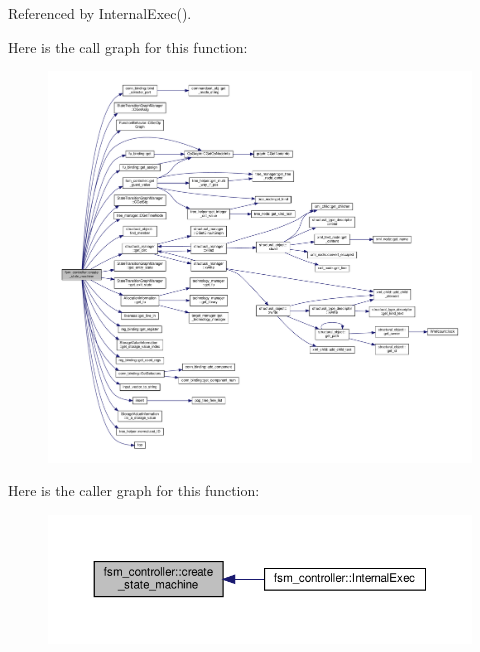 Referenced by Internal\+Exec().

Here is the call graph for this function\+:
\nopagebreak
\begin{figure}[H]
\begin{center}
\leavevmode
\includegraphics[width=350pt]{da/d3d/classfsm__controller_ab27526609ea8054ed2dfc08112900892_cgraph}
\end{center}
\end{figure}
Here is the caller graph for this function\+:
\nopagebreak
\begin{figure}[H]
\begin{center}
\leavevmode
\includegraphics[width=350pt]{da/d3d/classfsm__controller_ab27526609ea8054ed2dfc08112900892_icgraph}
\end{center}
\end{figure}
\mbox{\label{classfsm__controller_ac82a6e93ab9750f50a8565b72e1a028b}} 
